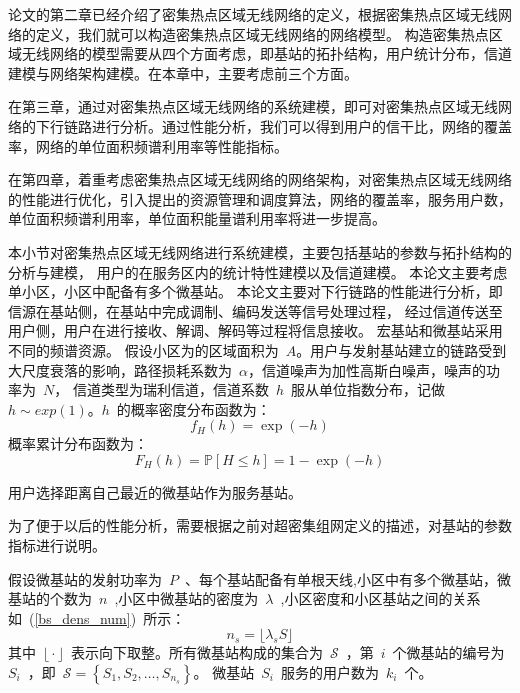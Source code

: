 

论文的第二章已经介绍了密集热点区域无线网络的定义，根据密集热点区域无线网络的定义，我们就可以构造密集热点区域无线网络的网络模型。
构造密集热点区域无线网络的模型需要从四个方面考虑，即基站的拓扑结构，用户统计分布，信道建模与网络架构建模。在本章中，主要考虑前三个方面。

在第三章，通过对密集热点区域无线网络的系统建模，即可对密集热点区域无线网络的下行链路进行分析。通过性能分析，我们可以得到用户的信干比，网络的覆盖率，网络的单位面积频谱利用率等性能指标。

在第四章，着重考虑密集热点区域无线网络的网络架构，对密集热点区域无线网络的性能进行优化，引入提出的资源管理和调度算法，网络的覆盖率，服务用户数，单位面积频谱利用率，单位面积能量谱利用率将进一步提高。


本小节对密集热点区域无线网络进行系统建模，主要包括基站的参数与拓扑结构的分析与建模，
用户的在服务区内的统计特性建模以及信道建模。
本论文主要考虑单小区，小区中配备有多个微基站。
本论文主要对下行链路的性能进行分析，即信源在基站侧，在基站中完成调制、编码发送等信号处理过程，
经过信道传送至用户侧，用户在进行接收、解调、解码等过程将信息接收。
宏基站和微基站采用不同的频谱资源。
假设小区为的区域面积为~$A$。用户与发射基站建立的链路受到大尺度衰落的影响，路径损耗系数为~$\alpha$，信道噪声为加性高斯白噪声，噪声的功率为~$N$，
信道类型为瑞利信道，信道系数~$h$~服从单位指数分布，记做~$h\sim exp(1)$。$h$~的概率密度分布函数为：
\begin{equation}\label{h_pdf}
  f_H(h) = \exp(-h)
\end{equation}
概率累计分布函数为：
\begin{equation}\label{h_cdf}
  F_H(h) = \mathbb{P}[H\leq h] = 1 - \exp(-h)
\end{equation}

用户选择距离自己最近的微基站作为服务基站。

为了便于以后的性能分析，需要根据之前对超密集组网定义的描述，对基站的参数指标进行说明。

假设微基站的发射功率为~$P$~、每个基站配备有单根天线,小区中有多个微基站，微基站的个数为~$n$~,小区中微基站的密度为~$\lambda$~,小区密度和小区基站之间的关系如~(\ref{bs_dens_num})~所示：
\begin{equation}\label{bs_dens_num}
  n_s = \biggl\lfloor\lambda_s S\biggr\rfloor
\end{equation}
其中~$\biggl\lfloor\cdot\biggr\rfloor$~表示向下取整。所有微基站构成的集合为~$\mathcal{S}$~，第~$i$~个微基站的编号为~$S_i$~，即~$\mathcal{S}=\left\{S_1, S_2,\dots,S_{n_s}\right\}$。
微基站~$S_i$~服务的用户数为~$k_i$~个。

